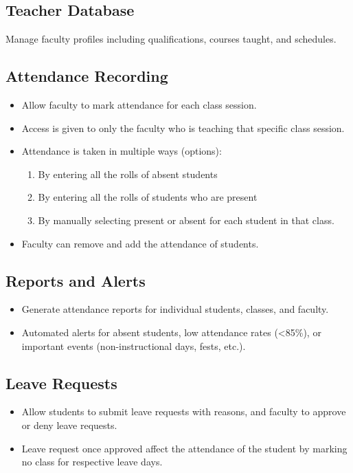 \documentclass{article}
\begin{document}
\subsection*{\Large{Teacher Database}}
\begin{large}
Manage faculty profiles including qualifications, courses taught, and schedules.
\end{large}

\subsection*{\Large{Attendance Recording}}
\begin{large}
\begin{itemize}[label={--}]
    \item Allow faculty to mark attendance for each class session.
    \item Access is given to only the faculty who is teaching that specific class session.
    \item Attendance is taken in multiple ways (options):
    \begin{enumerate}[label=\arabic*.]
        \item By entering all the rolls of absent students
        \item By entering all the rolls of students who are present
        \item By manually selecting present or absent for each student in that class.
    \end{enumerate}
    \item Faculty can remove and add the attendance of students.
\end{itemize}
\end{large}

\subsection*{\Large{Reports and Alerts}}
\begin{large}
\begin{itemize}[label={--}]
    \item Generate attendance reports for individual students, classes, and faculty.
    \item Automated alerts for absent students, low attendance rates (\textless{}85\%), or important events (non-instructional days, fests, etc.).
\end{itemize}
\end{large}

\subsection*{\Large{Leave Requests}}
\begin{large}
\begin{itemize}[label={--}]
    \item Allow students to submit leave requests with reasons, and faculty to approve or deny leave requests.
    \item Leave request once approved affect the attendance of the student by marking no class for respective leave days.
\end{itemize}
\end{large}
\end{document}
